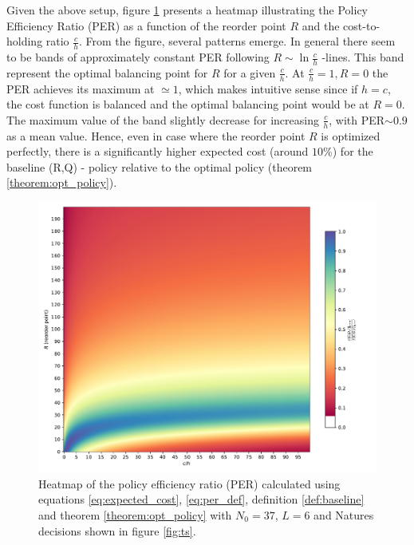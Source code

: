 Given the above setup, figure \ref{fig:per} presents a heatmap illustrating the Policy Efficiency Ratio (PER) as a function of the reorder point $R$ and the cost-to-holding ratio $\frac{c}{h}$. From the figure, several patterns emerge. In general there seem to be bands of approximately constant PER following $R\sim \ln\frac{c}{h}$ -lines. This band represent the optimal balancing point for $R$ for a given $\frac{c}{h}$. At $\frac{c}{h}=1, R=0$ the PER achieves its maximum at $\simeq 1$, which makes intuitive sense since if $h=c$, the cost function is balanced and the optimal balancing point would be at $R=0$. The maximum value of the band slightly decrease for increasing $\frac{c}{h}$, with PER$\sim 0.9$ as a mean value. Hence, even in case where the reorder point $R$ is optimized perfectly, there is a significantly higher expected cost (around $10\%$) for the baseline (R,Q) - policy relative to the optimal policy (theorem \ref{theorem:opt_policy}). 
\begin{figure}[h!]
	\centering
	\includegraphics[width=1\textwidth]{figures/per.pdf}
	\caption{Heatmap of the policy efficiency ratio (PER) calculated using equations \eqref{eq:expected_cost}, \eqref{eq:per_def}, definition \ref{def:baseline} and theorem \ref{theorem:opt_policy} with $N_0=37$, $L=6$ and Natures decisions shown in figure \ref{fig:ts}.}
	\label{fig:per}
\end{figure}